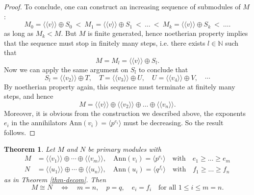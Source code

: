 \documentclass[11pt,openany]{book}
\theoremstyle{plain}
\newtheorem{theorem}{Theorem}[chapter]
\theoremstyle{definition}
\theoremstyle{remark}
\begin{document}
\begin{proof}
    \bigskip
    To conclude, one can construct an increasing sequence of submodules of $M$:
    $$M_0 = \langle \langle v \rangle \rangle \oplus S_0\ <\ M_1 = \langle \langle v \rangle \rangle \oplus S_1\ <\ \dots\ <\ M_k = \langle \langle v \rangle \rangle \oplus S_k\ <\ \dots.$$
    as long as $M_k < M$. But $M$ is finite generated, hence noetherian property implies that the sequence must stop in finitely many steps, i.e. there exists $l \in \mathbb{N}$ such that
    $$M = M_l = \langle \langle v \rangle \rangle \oplus S_l.$$
    Now we can apply the same argument on $S_l$ to conclude that
    $$S_l = \langle \langle v_2 \rangle \rangle \oplus T, \quad T = \langle \langle v_3 \rangle \rangle \oplus U, \quad U = \langle \langle v_4 \rangle \rangle \oplus V, \quad \cdots$$
    By noetherian property again, this sequence must terminate at finitely many steps, and hence
    $$M = \langle \langle v \rangle \rangle \oplus \langle \langle v_2 \rangle \rangle \oplus \dots \oplus \langle \langle v_n \rangle \rangle.$$
    Moreover, it is obvious from the construction we described above, the exponents $e_i$ in the annihilators $\mathrm{Ann}(v_i) = \langle p^{e_i}\rangle$ must be decreasing. So the result follows.
\end{proof}

\begin{theorem}
    Let $M$ and $N$ be primary modules with
    \begin{align*}
        M&=\langle\langle v_1\rangle\rangle\oplus\cdots\oplus\langle\langle v_m\rangle\rangle,\quad\mathrm{Ann}(v_i)= \langle p^{e_i} \rangle \quad \text{with} \quad e_1 \geq \dots \geq e_m\\
        N&=\langle\langle u_1\rangle\rangle\oplus\cdots\oplus\langle\langle u_n\rangle\rangle,\quad\mathrm{Ann}(u_i)=\langle q^{f_i} \rangle \quad \text{with} \quad f_1 \geq \dots \geq f_n
    \end{align*}
    as in Theorem \ref{thm-decom}. Then
    $$M\cong N\quad\Leftrightarrow\quad m=n,\quad p=q,\quad e_i=f_i\quad\text{for all }1\leq i\leq m=n.$$
\end{theorem}
\end{document}
